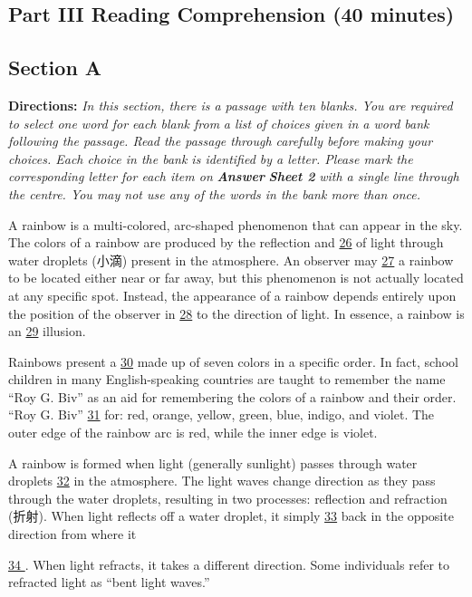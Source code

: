\documentclass[UTF8,11pt]{ctexart}
\begin{document}
\subsection*{\textbf{Part III Reading Comprehension (40 minutes)}}


\subsection*{\textbf{Section A}}


\textbf{Directions:} \textit{In this section, there is a passage with ten blanks. You are required to select one word for each blank from} \textit{a list of choices given in a word bank following the passage. Read the passage through carefully before making your} \textit{choices. Each choice in the bank is identified by a letter. Please mark the corresponding letter for each item on }\textbf{\textit{Answer}} \textbf{\textit{Sheet 2}}\textit{ with a single line through the centre. You may not use any of the words in the bank more than once.}


A rainbow is a multi-colored, arc-shaped phenomenon that can appear in the sky. The colors of a rainbow are produced by the reflection and \uline{26} of light through water droplets (小滴) present in the atmosphere. An observer may \uline{27} a rainbow to be located either near or far away, but this phenomenon is not actually located at any specific spot. Instead, the appearance of a rainbow depends entirely upon the position of the observer in \uline{28} to the direction of light. In essence, a rainbow is an \uline{29} illusion.


Rainbows present a \uline{30} made up of seven colors in a specific order. In fact, school children in many English-speaking countries are taught to remember the name “Roy G. Biv” as an aid for remembering the colors of a rainbow and their order. “Roy G. Biv” \uline{31} for: red, orange, yellow, green, blue, indigo, and violet. The outer edge of the rainbow arc is red, while the inner edge is violet.


A rainbow is formed when light (generally sunlight) passes through water droplets \uline{32} in the atmosphere. The light waves change direction as they pass through the water droplets, resulting in two processes: reflection and refraction (折射). When light reflects off a water droplet, it simply \uline{33} back in the opposite direction from where it


\uline{34 }. When light refracts, it takes a different direction. Some individuals refer to refracted light as “bent light waves.”
\end{document}
